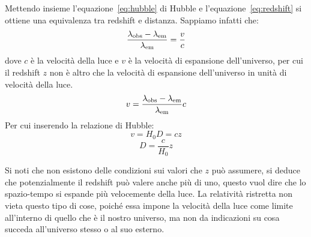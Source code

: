 Mettendo insieme l'equazione~\eqref{eq:hubble} di Hubble e l'equazione~\eqref{eq:redshift} si ottiene una equivalenza tra redshift e distanza. Sappiamo infatti che:
\[
    \frac{\lambda_\textup{obs} - \lambda_\textup{em}}{\lambda_\textup{em}} = \frac{v}{c}
\]
dove $c$ è la velocità della luce e $v$ è la velocità di espansione dell'universo, per cui il redshift $z$ non è altro che la velocità di espansione dell'universo in unità di velocità della luce.
\[
    v = \frac{\lambda_\textup{obs} - \lambda_\textup{em}}{\lambda_\textup{em}} c
\]
Per cui inserendo la relazione di Hubble:
\[
    v = H_0 D = c z
\]
\begin{equation}\label{eq:ditanza-redshift}
    D = \frac{c}{H_0}z
\end{equation}

Si noti che non esistono delle condizioni sui valori che $z$ può assumere, si deduce che potenzialmente il redshift può valere anche più di uno, questo vuol dire che lo spazio-tempo si espande più velocemente della luce. La relatività ristretta non vieta questo tipo di cose, poiché essa impone la velocità della luce come limite all'interno di quello che è il nostro universo, ma non da indicazioni su cosa succeda all'universo stesso o al suo esterno.